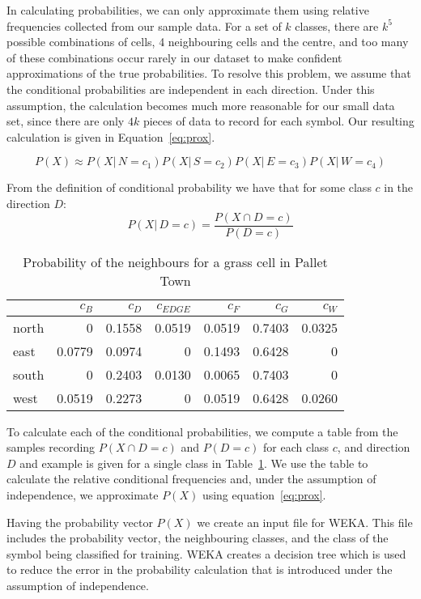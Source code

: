 In calculating probabilities, we can only approximate them using relative
frequencies collected from our sample data. For a set of $k$ classes, there are
$k^5$ possible combinations of cells, 4 neighbouring cells and the centre, and
too many of these combinations occur rarely in our dataset to make confident
approximations of the true probabilities. To resolve this problem, we assume
that the conditional probabilities are independent in each direction. Under
this assumption, the calculation becomes much more reasonable for our small
data set, since there are only $4k$ pieces of data to record for each symbol.
Our resulting calculation is given in Equation~\ref{eq:prox}.

\begin{equation}[h]
\label{eq:prox}
P(X) \approx P(X|\,N\!=\!c_1)P(X|\,S\!=\!c_2)P(X|\,E\!=\!c_3)P(X|\,W\!=\!c_4)
\end{equation}

From the definition of conditional probability we have that for some class $c$ in
the direction $D$:
\[ P(X|\,D\!=\!c) = \frac{P(X \cap D\!=\!c)}{P(D=c)} \]

\begin{table}[h]
\label{table:relativefreq}
\begin{center}
\begin{tabular}{ l | r r r r r r }
              & $c_{B}$& $c_{D}$& $c_{EDGE}$& $c_{F}$& $c_{G}$& $c_{W}$ \\ 
              \hline
    north     & 0      & 0.1558 & 0.0519    & 0.0519 & 0.7403 & 0.0325\\
    east      & 0.0779 & 0.0974 & 0         & 0.1493 & 0.6428 & 0\\
    south     & 0      & 0.2403 & 0.0130    & 0.0065 & 0.7403 & 0\\
    west      & 0.0519 & 0.2273 & 0         & 0.0519 & 0.6428 & 0.0260\\
\end{tabular}
\caption{Probability of the neighbours for a grass cell in Pallet Town}
\end{center}
\end{table}


To calculate each of the conditional probabilities, we compute a table from the
samples recording $P(X\cap D\!=\!c)$ and $P(D\!=\!c)$ for each class  $c$, and
direction $D$ and example is given for a single class in
Table~\ref{table:relativefreq}.  We use the table to calculate the relative
conditional frequencies and, under the assumption of independence, we
approximate $P(X)$ using equation~\ref{eq:prox}.

Having the probability vector $P(X)$ we create an input file for WEKA.  This
file includes the probability vector, the neighbouring classes, and the class
of the symbol being classified for training. WEKA creates a decision tree which
is used to reduce the error in the probability calculation that is introduced
under the assumption of independence.

